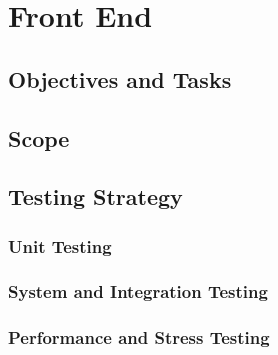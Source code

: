 \documentclass{article}
\begin{document}
\section{Front End}
	\subsection{Objectives and Tasks}
		
	\subsection{Scope}
		
	\subsection{Testing Strategy}
		\subsubsection{Unit Testing}
		\subsubsection{System and Integration Testing}
		\subsubsection{Performance and Stress Testing}
\end{document}
